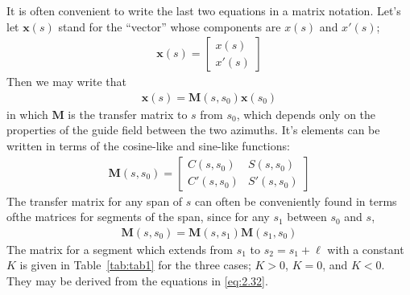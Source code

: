 It is often convenient to write the last two equations in a matrix notation. Let's let $\boldsymbol{x}(s)$ stand for the “vector” whose components are $x(s)$ and $x'(s)$;
\begin{align}
	\boldsymbol{x}(s) = \begin{bmatrix}
	x(s)\\ 
	x'(s)
	\end{bmatrix}
\end{align}
Then we may write that
\begin{align}
	\boldsymbol{x}(s)=\boldsymbol{M}(s,s_0)\boldsymbol{x}(s_0)
\end{align}
in which $\boldsymbol{M}$ is the transfer matrix to $s$ from $s_0$, which depends only on the properties of the guide field between the two azimuths. It's elements can be written in terms of the cosine-like and sine-like functions:
\begin{align}
	\boldsymbol{M}(s,s_0) = \begin{bmatrix}
	C(s,s_0) & S(s,s_0)\\
	C'(s,s_0) & S'(s,s_0)
	\end{bmatrix}\label{eq:2.37}
\end{align}
The transfer matrix for any span of $s$ can often be conveniently found in terms ofthe matrices for segments of the span, since for any $s_1$ between $s_0$ and $s$,
\begin{align}
	\boldsymbol{M}(s,s_0) = \boldsymbol{M}(s,s_1)\boldsymbol{M}(s_1,s_0)
\end{align}
The matrix for a segment which extends from $s_1$ to $s_2 = s_1 + \ell$ with a constant $K$ is given in Table~\ref{tab:tab1} for the three cases; $K > 0$, $K = 0$, and $K < 0$. They may be derived from the equations in \eqref{eq:2.32}.

